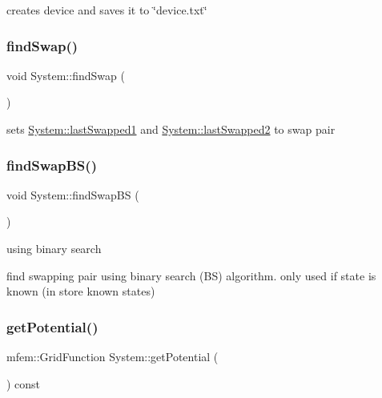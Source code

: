 creates device and saves it to \char`\"{}device.\+txt\char`\"{} \mbox{\label{classSystem_a2570343111c1794aca7e6005b4726b92}} 
\subsubsection{\texorpdfstring{find\+Swap()}{findSwap()}}
{\footnotesize\ttfamily void System\+::find\+Swap (\begin{DoxyParamCaption}{ }\end{DoxyParamCaption})\hspace{0.3cm}{\ttfamily [private]}}

sets \hyperlink{classSystem_a6cae5a9a0157f7e6042bda0807879568}{System\+::last\+Swapped1} and \hyperlink{classSystem_a6ddf57bedba9389eb75ffb60cad1391c}{System\+::last\+Swapped2} to swap pair \mbox{\label{classSystem_afbafce4188cca27e7e37892049b45856}} 
\subsubsection{\texorpdfstring{find\+Swap\+B\+S()}{findSwapBS()}}
{\footnotesize\ttfamily void System\+::find\+Swap\+BS (\begin{DoxyParamCaption}{ }\end{DoxyParamCaption})\hspace{0.3cm}{\ttfamily [private]}}

using binary search

find swapping pair using binary search (BS) algorithm. only used if state is known (in store known states) \mbox{\label{classSystem_a8b1198a23ff52e2460fd605f727419c2}} 
\subsubsection{\texorpdfstring{get\+Potential()}{getPotential()}}
{\footnotesize\ttfamily mfem\+::\+Grid\+Function System\+::get\+Potential (\begin{DoxyParamCaption}{ }\end{DoxyParamCaption}) const}

